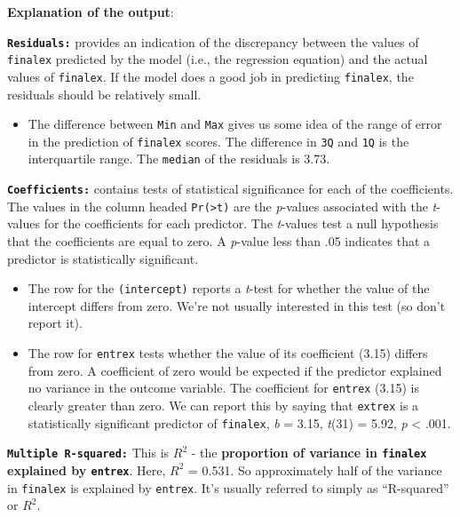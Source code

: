 \documentclass[
]{book}
\providecommand{\tightlist}{%
  \setlength{\itemsep}{0pt}\setlength{\parskip}{0pt}}
\theoremstyle{definition}
\theoremstyle{definition}
\theoremstyle{definition}
\theoremstyle{definition}
\theoremstyle{remark}
\begin{document}
\textbf{Explanation of the output}:

\hfill\break
\textbf{\texttt{Residuals:}} provides an indication of the discrepancy between the values of \texttt{finalex} predicted by the model (i.e., the regression equation) and the actual values of \texttt{finalex}. If the model does a good job in predicting \texttt{finalex}, the residuals should be relatively small.

\begin{itemize}
\tightlist
\item
  The difference between \texttt{Min} and \texttt{Max} gives us some idea of the range of error in the prediction of \texttt{finalex} scores. The difference in \texttt{3Q} and \texttt{1Q} is the interquartile range. The \texttt{median} of the residuals is 3.73.
\end{itemize}

\hfill\break
\textbf{\texttt{Coefficients:}} contains tests of statistical significance for each of the coefficients. The values in the column headed \texttt{Pr(\textgreater{}\textbar{}t\textbar{})} are the \emph{p}-values associated with the \emph{t}-values for the coefficients for each predictor. The \emph{t}-values test a null hypothesis that the coefficients are equal to zero. A \emph{p}-value less than .05 indicates that a predictor is statistically significant.

\begin{itemize}
\item
  The row for the \texttt{(intercept)} reports a \emph{t}-test for whether the value of the intercept differs from zero. We're not usually interested in this test (so don't report it).
\item
  The row for \texttt{entrex} tests whether the value of its coefficient (3.15) differs from zero. A coefficient of zero would be expected if the predictor explained no variance in the outcome variable. The coefficient for \texttt{entrex} (3.15) is clearly greater than zero. We can report this by saying that \texttt{extrex} is a statistically significant predictor of \texttt{finalex}, \emph{b} = 3.15, \emph{t}(31) = 5.92, \emph{p} \textless{} .001.
\end{itemize}

\hfill\break
\textbf{\texttt{Multiple\ R-squared:}} This is \(R^2\) - the \textbf{proportion of variance in \texttt{finalex} explained by \texttt{entrex}}. Here, \(R^2\) = 0.531. So approximately half of the variance in \texttt{finalex} is explained by \texttt{entrex}. It's usually referred to simply as ``R-squared'' or \(R^2\).
\end{document}
